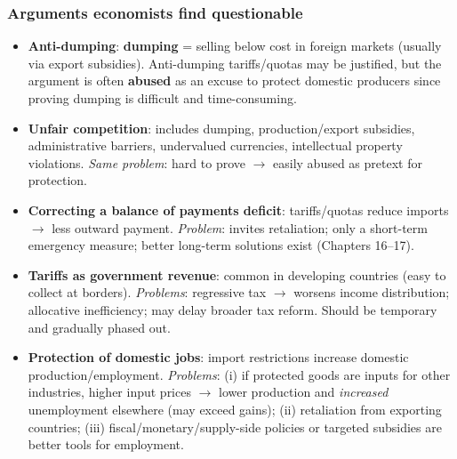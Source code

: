 \documentclass[a4paper,12pt]{article}
\newcommand{\needbold}[1]{\textcolor{red!70!black}{\textbf{#1}}}
\begin{document}
\subsubsection*{Arguments economists find questionable}
\begin{itemize}
  \item \textbf{Anti-dumping}: \needbold{dumping} = selling below cost in foreign markets (usually via export subsidies). Anti-dumping tariffs/quotas may be justified, but the argument is often \textbf{abused} as an excuse to protect domestic producers since proving dumping is difficult and time-consuming.
  \item \textbf{Unfair competition}: includes dumping, production/export subsidies, administrative barriers, undervalued currencies, intellectual property violations. \textit{Same problem}: hard to prove $\to$ easily abused as pretext for protection.
  \item \textbf{Correcting a balance of payments deficit}: tariffs/quotas reduce imports $\to$ less outward payment. \textit{Problem}: invites retaliation; only a short-term emergency measure; better long-term solutions exist (Chapters 16--17).
  \item \textbf{Tariffs as government revenue}: common in developing countries (easy to collect at borders). \textit{Problems}: regressive tax $\to$ worsens income distribution; allocative inefficiency; may delay broader tax reform. Should be temporary and gradually phased out.
  \item \textbf{Protection of domestic jobs}: import restrictions increase domestic production/employment. \textit{Problems}: (i) if protected goods are inputs for other industries, higher input prices $\to$ lower production and \textit{increased} unemployment elsewhere (may exceed gains); (ii) retaliation from exporting countries; (iii) fiscal/monetary/supply-side policies or targeted subsidies are better tools for employment.
\end{itemize}
\end{document}

